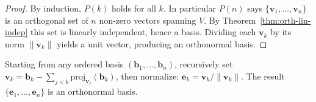 \documentclass[11pt, a4paper, notitlepage]{report}
\theoremstyle{definition}
\theoremstyle{remark}
\begin{document}
\begin{proof}
\medskip
By induction, $P(k)$ holds for all $k$. In particular $P(n)$ says
$\{\mathbf{v}_1,\ldots,\mathbf{v}_n\}$ is an orthogonal set of $n$ non-zero vectors spanning $V$.
By Theorem~\ref{thm:orth-lin-indep} this set is linearly independent, hence a basis.
Dividing each $\mathbf{v}_k$ by its norm $\|\mathbf{v}_k\|$ yields a unit vector, producing
an orthonormal basis.
\end{proof}

\begin{keyresult}[title={Key Result: Gram--Schmidt Algorithm}]
Starting from any ordered basis $(\mathbf{b}_1,\ldots,\mathbf{b}_n)$, recursively set
$\mathbf{v}_k = \mathbf{b}_k - \sum_{j<k}\mathrm{proj}_{\mathbf{v}_j}(\mathbf{b}_k)$,
then normalize: $\mathbf{e}_k = \mathbf{v}_k/\|\mathbf{v}_k\|$.
The result $\{\mathbf{e}_1,\ldots,\mathbf{e}_n\}$ is an orthonormal basis.
\end{keyresult}
\end{document}
